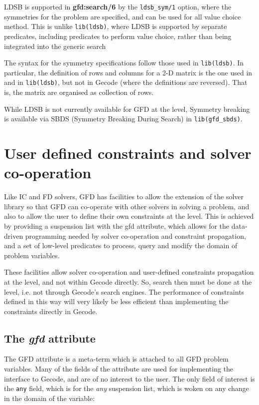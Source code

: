 LDSB is supported in {\bf gfd:search/6} by the \texttt{ldsb_sym/1} option, 
where the  symmetries for the problem are specified, and can be used
for all value choice method. This is unlike 
\texttt{lib(ldsb)}, where LDSB is supported by separate predicates,
including predicates to perform value choice, rather than being integrated 
into the generic search

The syntax for the symmetry specifications follow those used in
\texttt{lib(ldsb)}. In particular, the definition of rows and columns 
for a 2-D matrix is the one used in \eclipse and in 
\texttt{lib(ldsb)}, but not in Gecode (where the definitions are reversed).
That is, the matrix are organised as collection of rows.

While LDSB is not currently available for GFD at the \eclipse level, Symmetry
breaking is available via SBDS
(Symmetry Breaking During Search) in \texttt{lib(gfd_sbds)}.

\section{User defined constraints and solver co-operation}
Like IC and FD solvers, GFD has facilities to allow the extension of the 
solver library so that GFD can co-operate with other solvers in solving a
problem, and also to allow the user to define their own constraints at the {\eclipse}
level. This is achieved by providing a suspension list with the gfd attribute,
which allows for the data-driven programming needed by solver co-operation and
constraint propagation, and a set of low-level predicates to process,
 query and  modify the domain of problem variables.

These facilities allow solver co-operation and user-defined 
constraints propagation at the {\eclipse} level, and not within Gecode directly.
So, search then must be done at the {\eclipse} level, i.e. not through Gecode's
search engines. The performance of constraints defined in this way will very
likely be less efficient than implementing the constraints directly in Gecode.

\subsection{The {\it gfd\/} attribute}

The GFD attribute is a meta-term which is attached to all GFD problem variables.
Many of the fields of the attribute are used for implementing the interface to
Gecode, and are of no interest to the user. The only field of interest is the
{\tt any} field, which is for the {\it any\/} suspension list, which is woken on 
any change in the domain of the variable:

